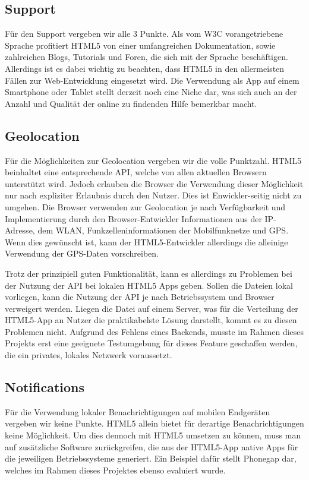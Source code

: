 \subsection{Support}
Für den Support vergeben wir alle 3 Punkte. Als vom W3C vorangetriebene Sprache profitiert HTML5 von einer umfangreichen Dokumentation, sowie zahlreichen Blogs, Tutorials und Foren, die sich mit der Sprache beschäftigen. Allerdings ist es dabei wichtig zu beachten, dass HTML5 in den allermeisten Fällen zur Web-Entwicklung eingesetzt wird. Die Verwendung als App auf einem Smartphone oder Tablet stellt derzeit noch eine Niche dar, was sich auch an der Anzahl und Qualität der online zu findenden Hilfe bemerkbar macht.

\subsection{Geolocation}
Für die Möglichkeiten zur Geolocation vergeben wir die volle Punktzahl. HTML5 beinhaltet eine entsprechende API, welche von allen aktuellen Browsern unterstützt wird. Jedoch erlauben die Browser die Verwendung dieser Möglichkeit nur nach expliziter Erlaubnis durch den Nutzer. Dies ist Enwickler-seitig nicht zu umgehen. Die Browser verwenden zur Geolocation je nach Verfügbarkeit und Implementierung durch den Browser-Entwickler Informationen aus der IP-Adresse, dem WLAN, Funkzelleninformationen der Mobilfunknetze und GPS. Wenn dies gewünscht ist, kann der HTML5-Entwickler allerdings die alleinige Verwendung der GPS-Daten vorschreiben.

Trotz der prinzipiell guten Funktionalität, kann es allerdings zu Problemen bei der Nutzung der API bei lokalen HTML5 Apps geben. Sollen die Dateien lokal vorliegen, kann die Nutzung der API je nach Betriebssystem und Browser verweigert werden. Liegen die Datei auf einem Server, was für die Verteilung der HTML5-App an Nutzer die praktikabelste Lösung darstellt, kommt es zu diesen Problemen nicht. Aufgrund des Fehlens eines Backends, musste im Rahmen dieses Projekts erst eine geeignete Testumgebung für dieses Feature geschaffen werden, die ein privates, lokales Netzwerk voraussetzt.

\subsection{Notifications}
Für die Verwendung lokaler Benachrichtigungen auf mobilen Endgeräten vergeben wir keine Punkte. HTML5 allein bietet für derartige Benachrichtigungen keine Möglichkeit. Um dies dennoch mit HTML5 umsetzen zu können, muss man auf zusätzliche Software zurückgreifen, die aus der HTML5-App native Apps für die jeweiligen Betriebssysteme generiert. Ein Beispiel dafür stellt Phonegap dar, welches im Rahmen dieses Projektes ebenso evaluiert wurde.

